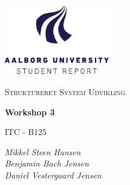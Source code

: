 \begin{titlepage}
    \centering
	\includegraphics[width=0.35\textwidth]{Projectdoc/Assets/Illustrationer/aau_logo_en.pdf}\par\vspace{1cm}
	{\scshape\Large Struktureret System Udvikling\par}
	\vspace{0.2cm}
	{\huge\bfseries Workshop 3\par}
	\vspace{0.2cm}
	{\scshape\Large ITC - B125\par}
	\vspace{2cm}
	{\Large\itshape 
    	Mikkel Steen Hansen\\
        Benjamin Bach Jensen\\
        Daniel Vestergaard Jensen\\
    \par}
	\vfill
	\vfill
\end{titlepage}